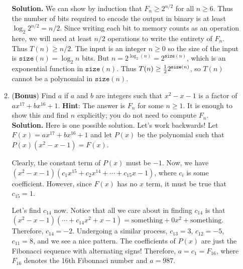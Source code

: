 \documentclass[11pt]{article}
\begin{document}
\begin{enumerate}
\begin{enumerate}
 \textbf{Solution.} We can show by induction that $F_{n} \geq 2^{n/2}$ for all $n \geq 6$. Thus the number of bits required to encode the output in binary is at least $\log_{2}2^{n/2} = n/2$. Since writing each bit to memory counts as an operation here, we will need at least $n/2$ operations to write the entirety of $F_{n}$. Thus $T(n) \geq n/2$. The input is an integer $n \geq 0$ so the size of the input is $\texttt{size}(n) = \log_{2}n$ bits. But $n = 2^{\log_{2}(n)} = 2^{\texttt{size}(n)}$, which is an exponential function in $\texttt{size}(n)$. Thus $T(n) \geq {1 \over 2} 2^{\texttt{size}(n)}$, so $T(n)$ cannot be a polynomial in $\texttt{size}(n)$.


\item (\textbf{Bonus}) Find $a$ if $a$ and $b$ are integers such that $x^2 - x - 1$ is a factor of $ax^{17} + bx^{16} + 1$. \textbf{Hint}: The answer is $F_{n}$ for some $n \geq 1$. It is enough to show this and find $n$ explicitly; you do not need to compute $F_{n}$. \\

\textbf{Solution.} Here is one possible solution. Let's work backwards! Let $F(x) = ax^{17} + bx^{16} + 1$ and let $P(x)$ be the polynomial such that $P(x)(x^2 - x - 1) = F(x)$.

Clearly, the constant term of $P(x)$ must be $- 1$. Now, we have $(x^2 - x - 1)(c_1x^{15} + c_2x^{14} + \cdots + c_{15}x - 1)$, where $c_{i}$ is some coefficient. However, since $F(x)$ has no $x$ term, it must be true that $c_{15} = 1$.

Let's find $c_{14}$ now. Notice that all we care about in finding $c_{14}$ is that $(x^2 - x - 1)(\cdots + c_{14}x^2 + x - 1) = \text{something} + 0x^2 + \text{something}$. Therefore, $c_{14} = - 2$. Undergoing a similar process, $c_{13} = 3$, $c_{12} = - 5$, $c_{11} = 8$, and we see a nice pattern. The coefficients of $P(x)$ are just the Fibonacci sequence with alternating signs! Therefore, $a = c_1 = F_{16}$, where $F_{16}$ denotes the 16th Fibonnaci number and $a = 987$. 


\end{enumerate}
\end{enumerate}
\end{document}
